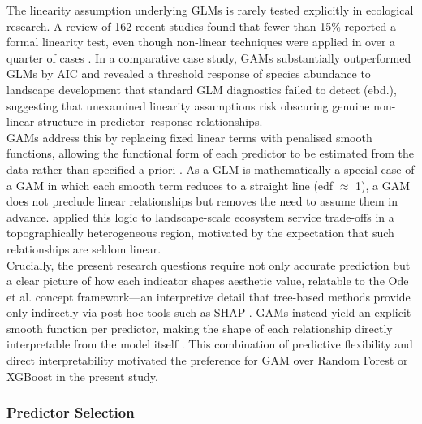 \documentclass[hidelinks, 11pt]{article}
\begin{document}
The linearity assumption underlying GLMs is rarely tested explicitly in ecological research. A review of 162 recent studies found that fewer than 15\% reported a formal linearity test, even though non-linear techniques were applied in over a quarter of cases \citep{heit_generalized_2024}. In a comparative case study, GAMs substantially outperformed GLMs by AIC and revealed a threshold response of species abundance to landscape development that standard GLM diagnostics failed to detect (ebd.), suggesting that unexamined linearity assumptions risk obscuring genuine non-linear structure in predictor--response relationships.
\\
GAMs address this by replacing fixed linear terms with penalised smooth functions, allowing the functional form of each predictor to be estimated from the data rather than specified a priori \citep{wood_generalized_2017,pedersen_hierarchical_2019}. As a GLM is mathematically a special case of a GAM in which each smooth term reduces to a straight line (edf $\approx$ 1), a GAM does not preclude linear relationships but removes the need to assume them in advance. \citet{huang_generalized_2022} applied this logic to landscape-scale ecosystem service trade-offs in a topographically heterogeneous region, motivated by the expectation that such relationships are seldom linear.
\\
Crucially, the present research questions require not only accurate prediction but a clear picture of how each indicator shapes aesthetic value, relatable to the Ode et al. concept framework---an interpretive detail that tree-based methods provide only indirectly via post-hoc tools such as SHAP \citep{comalada_modelling_2025}. GAMs instead yield an explicit smooth function per predictor, making the shape of each relationship directly interpretable from the model itself \citep{wood_generalized_2017,pedersen_hierarchical_2019}. This combination of predictive flexibility and direct interpretability motivated the preference for GAM over Random Forest or XGBoost in the present study.

\subsubsection{Predictor Selection}
\end{document}

